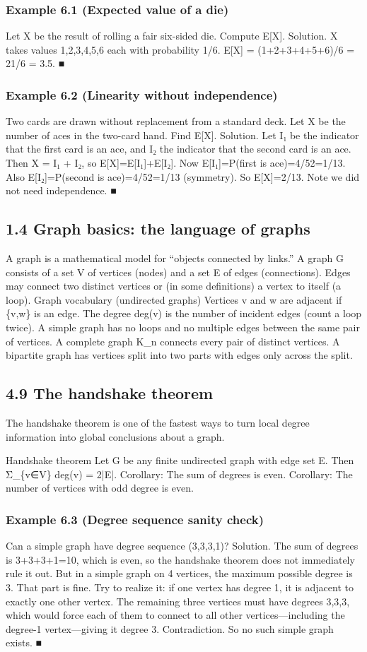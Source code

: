 \documentclass[11pt]{article}
\begin{document}
\subsubsection*{Example 6.1 (Expected value of a die)}
Let X be the result of rolling a fair six-sided die. Compute E[X].
Solution. X takes values 1,2,3,4,5,6 each with probability 1/6.
E[X] = (1+2+3+4+5+6)/6 = 21/6 = 3.5. ■
\subsubsection*{Example 6.2 (Linearity without independence)}
Two cards are drawn without replacement from a standard deck. Let X be the
number of aces in the two-card hand. Find E[X].
Solution. Let I₁ be the indicator that the first card is an ace, and I₂ the indicator
that the second card is an ace.
Then X = I₁ + I₂, so E[X]=E[I₁]+E[I₂].
Now E[I₁]=P(first is ace)=4/52=1/13. Also E[I₂]=P(second is ace)=4/52=1/13
(symmetry).
So E[X]=2/13. Note we did not need independence. ■
\subsection{1.4 Graph basics: the language of graphs}
A graph is a mathematical model for “objects connected by links.” A graph G consists of a
set V of vertices (nodes) and a set E of edges (connections). Edges may connect two
distinct vertices or (in some definitions) a vertex to itself (a loop).
Graph vocabulary (undirected graphs)
Vertices v and w are adjacent if \{v,w\} is an edge.
The degree deg(v) is the number of incident edges (count a loop twice).
A simple graph has no loops and no multiple edges between the same pair of
vertices.
A complete graph K\_n connects every pair of distinct vertices.
A bipartite graph has vertices split into two parts with edges only across the split.
\subsection{4.9 The handshake theorem}
The handshake theorem is one of the fastest ways to turn local degree information into
global conclusions about a graph.

Handshake theorem
Let G be any finite undirected graph with edge set E. Then Σ\_\{v∈V\} deg(v) = 2|E|.
Corollary: The sum of degrees is even.
Corollary: The number of vertices with odd degree is even.
\subsubsection*{Example 6.3 (Degree sequence sanity check)}
Can a simple graph have degree sequence (3,3,3,1)?
Solution. The sum of degrees is 3+3+3+1=10, which is even, so the handshake
theorem does not immediately rule it out.
But in a simple graph on 4 vertices, the maximum possible degree is 3. That part is
fine.
Try to realize it: if one vertex has degree 1, it is adjacent to exactly one other
vertex. The remaining three vertices must have degrees 3,3,3, which would force
each of them to connect to all other vertices—including the degree-1
vertex—giving it degree 3. Contradiction.
So no such simple graph exists. ■
\end{document}
